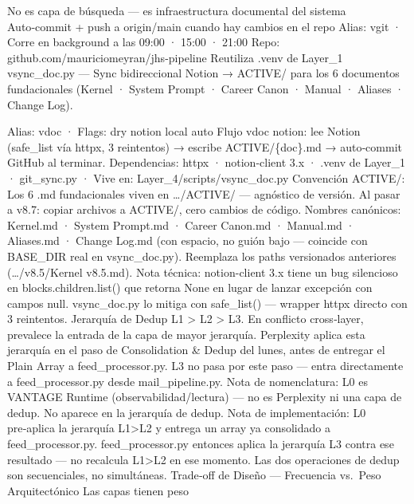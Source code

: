 \documentclass[
]{article}
\newenvironment{Shaded}{}{}
\newcommand{\NormalTok}[1]{#1}
\begin{document}
\begin{Shaded}
\begin{Highlighting}[]
\NormalTok{No es capa de búsqueda — es infraestructura documental del sistema }
\NormalTok{Auto‑commit + push a origin/main cuando hay cambios en el repo }
\NormalTok{Alias: vgit · Corre en background a las 09:00 · 15:00 · 21:00 }
\NormalTok{Repo: github.com/mauriciomeyran/jhs{-}pipeline }
\NormalTok{Reutiliza .venv de Layer\_1 }
\NormalTok{vsync\_doc.py — Sync bidireccional Notion → ACTIVE/ para los 6 documentos fundacionales (Kernel · System Prompt · Career Canon · Manual · Aliases · Change Log).}
\end{Highlighting}
\end{Shaded}

Alias: vdoc · Flags: dry \textbar{} notion \textbar{} local \textbar{}
auto Flujo vdoc notion: lee Notion (safe\_list vía httpx, 3 reintentos)
→ escribe ACTIVE/\{doc\}.md → auto‑commit GitHub al terminar.
Dependencias: httpx · notion-client 3.x · .venv de Layer\_1 ·
git\_sync.py · Vive en: Layer\_4/scripts/vsync\_doc.py Convención
ACTIVE/: Los 6 .md fundacionales viven en \ldots/ACTIVE/ --- agnóstico
de versión. Al pasar a v8.7: copiar archivos a ACTIVE/, cero cambios de
código. Nombres canónicos: Kernel.md · System Prompt.md · Career
Canon.md · Manual.md · Aliases.md · Change Log.md (con espacio, no guión
bajo --- coincide con BASE\_DIR real en vsync\_doc.py). Reemplaza los
paths versionados anteriores (\ldots/v8.5/Kernel v8.5.md). Nota técnica:
notion-client 3.x tiene un bug silencioso en blocks.children.list() que
retorna None en lugar de lanzar excepción con campos null. vsync\_doc.py
lo mitiga con safe\_list() --- wrapper httpx directo con 3 reintentos.
Jerarquía de Dedup L1 \textgreater{} L2 \textgreater{} L3. En conflicto
cross‑layer, prevalece la entrada de la capa de mayor jerarquía.
Perplexity aplica esta jerarquía en el paso de Consolidation \& Dedup
del lunes, antes de entregar el Plain Array a feed\_processor.py. L3 no
pasa por este paso --- entra directamente a feed\_processor.py desde
mail\_pipeline.py. Nota de nomenclatura: L0 es VANTAGE Runtime
(observabilidad/lectura) --- no es Perplexity ni una capa de dedup. No
aparece en la jerarquía de dedup. Nota de implementación: L0 pre‑aplica
la jerarquía L1\textgreater L2 y entrega un array ya consolidado a
feed\_processor.py. feed\_processor.py entonces aplica la jerarquía L3
contra ese resultado --- no recalcula L1\textgreater L2 en ese momento.
Las dos operaciones de dedup son secuenciales, no simultáneas. Trade‑off
de Diseño --- Frecuencia vs.~Peso Arquitectónico Las capas tienen peso
\end{document}
